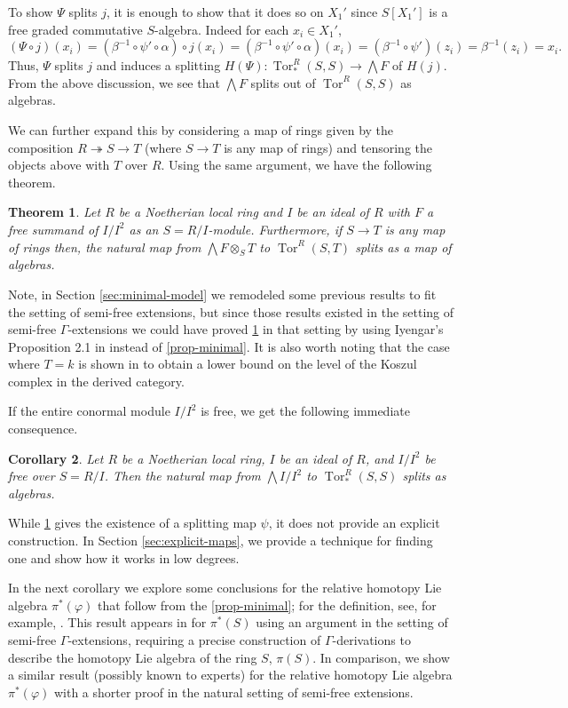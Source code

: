 \documentclass{amsart}
\newtheorem{theorem}{Theorem}[section]
\newtheorem{corollary}[theorem]{Corollary}
\theoremstyle{definition}
\theoremstyle{remark}
\newcommand{\Tor}{\ensuremath{\operatorname{Tor}}}
\begin{document}
To show $\Psi$ splits $j$, it is enough to show that it does so on $X_1'$ since $S[ X_1']$ is a free graded commutative $S$-algebra.
Indeed for each $x_i \in X_1'$,
\[
(\Psi\circ j) (x_i)= (\beta^{-1}\circ \psi' \circ \alpha) \circ j(x_i)= (\beta^{-1}\circ \psi' \circ \alpha)(x_i)= (\beta^{-1} \circ \psi')(z_i)= \beta^{-1}(z_i)=x_i.
\]
Thus, $\Psi$ splits $j$ and induces a splitting $H(\Psi)\colon \Tor^R_{*}(S,S) \to \bigwedge F$ of $H(j)$. From the above discussion, we see that $\bigwedge F$ splits out of $\Tor^R(S,S)$ as algebras.


We can further expand this by considering a map of rings given by the composition $R \twoheadrightarrow S \to T$ (where $S \to T$ is any map of rings) and tensoring the objects above with $T$ over $R$. Using the same argument, we have the following theorem.


\begin{theorem}
\label{maintheoremSec3}
    Let $R$ be a Noetherian local ring and $I$ be an ideal of $R$ with $F$ a free summand of $I/I^2$ as an $S= R/I$-module. Furthermore, if $S \to T$ is any map of rings then, the natural map from $\bigwedge F \otimes_{S} T$ to $\Tor^{R}(S,T)$ splits as a map of algebras.
\end{theorem}
Note, in Section \ref{sec:minimal-model} we remodeled some previous results to fit the setting of semi-free extensions, but since those results existed in the setting of semi-free $\Gamma$-extensions we could have proved \cref{maintheoremSec3} in that setting by using Iyengar's Proposition 2.1 in \cite{Iyengar2001} instead of \cref{prop-minimal}. It is also worth noting that the case where $T = k$ is shown in \cite{Kekkou} to obtain a lower
bound on the level of the Koszul complex in the derived category.

If the entire conormal module $I/I^2$ is free, we get the following immediate consequence.

\begin{corollary}
    Let $R$ be a Noetherian local ring, $I$ be an ideal of $R$, and $I/I^2$ be free over $S=R/I$. Then the natural map from $\bigwedge I/I^2$ to $\Tor^{R}_{*}(S,S)$ splits as algebras.
\end{corollary}
While \cref{maintheoremSec3} gives the existence of a splitting map $\psi$, it does not provide an explicit construction. In Section \ref{sec:explicit-maps}, we provide a technique for finding one and show how it works in low degrees. 

In the next corollary we explore some conclusions for the relative homotopy Lie algebra $\pi^*(\varphi)$ that follow from the \cref{prop-minimal}; for the definition, see, for example, 
\cite{AvramovIFR}.
This result appears in \cite{Iyengar2001} for $\pi^*(S)$ using an argument in the setting of semi-free $\Gamma$-extensions, requiring a precise construction of $\Gamma$-derivations to describe the homotopy Lie algebra of the ring $S$, $\pi(S)$. In comparison, we show a similar result (possibly known to experts) for the relative homotopy Lie algebra $\pi^*(\varphi)$ with a shorter proof in the natural setting of semi-free extensions.
\end{document}
